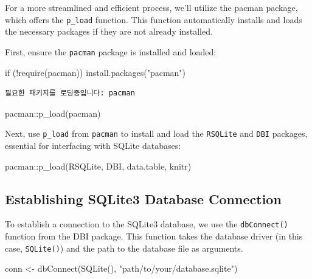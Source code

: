 \documentclass[
  letterpaper,
]{scrbook}
\newenvironment{Shaded}{\begin{snugshade}}{\end{snugshade}}
\newcommand{\ControlFlowTok}[1]{\textcolor[rgb]{0.00,0.23,0.31}{#1}}
\newcommand{\FunctionTok}[1]{\textcolor[rgb]{0.28,0.35,0.67}{#1}}
\newcommand{\NormalTok}[1]{\textcolor[rgb]{0.00,0.23,0.31}{#1}}
\newcommand{\OtherTok}[1]{\textcolor[rgb]{0.00,0.23,0.31}{#1}}
\newcommand{\SpecialCharTok}[1]{\textcolor[rgb]{0.37,0.37,0.37}{#1}}
\newcommand{\StringTok}[1]{\textcolor[rgb]{0.13,0.47,0.30}{#1}}
\begin{document}
For a more streamlined and efficient process, we'll utilize the pacman
package, which offers the \texttt{p\_load} function. This function
automatically installs and loads the necessary packages if they are not
already installed.

First, ensure the \texttt{pacman} package is installed and loaded:

\begin{Shaded}
\begin{Highlighting}[]
\ControlFlowTok{if}\NormalTok{ (}\SpecialCharTok{!}\FunctionTok{require}\NormalTok{(pacman)) }\FunctionTok{install.packages}\NormalTok{(}\StringTok{"pacman"}\NormalTok{)}
\end{Highlighting}
\end{Shaded}

\begin{verbatim}
필요한 패키지를 로딩중입니다: pacman
\end{verbatim}

\begin{Shaded}
\begin{Highlighting}[]
\NormalTok{pacman}\SpecialCharTok{::}\FunctionTok{p\_load}\NormalTok{(pacman)}
\end{Highlighting}
\end{Shaded}

Next, use \texttt{p\_load} from \texttt{pacman} to install and load the
\texttt{RSQLite} and \texttt{DBI} packages, essential for interfacing
with SQLite databases:

\begin{Shaded}
\begin{Highlighting}[]
\NormalTok{pacman}\SpecialCharTok{::}\FunctionTok{p\_load}\NormalTok{(RSQLite, DBI, data.table, knitr)}
\end{Highlighting}
\end{Shaded}

\subsection{Establishing SQLite3 Database
Connection}\label{establishing-sqlite3-database-connection}

To establish a connection to the SQLite3 database, we use the
\texttt{dbConnect()} function from the DBI package. This function takes
the database driver (in this case, \texttt{SQLite()}) and the path to
the database file as arguments.

\begin{Shaded}
\begin{Highlighting}[]
\NormalTok{conn }\OtherTok{\textless{}{-}} \FunctionTok{dbConnect}\NormalTok{(}\FunctionTok{SQLite}\NormalTok{(), }\StringTok{"path/to/your/database.sqlite"}\NormalTok{)}
\end{Highlighting}
\end{Shaded}
\end{document}
